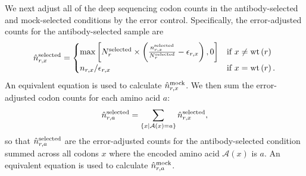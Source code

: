 \documentclass[11pt]{article}
\begin{document}
We next adjust all of the deep sequencing codon counts in the antibody-selected and mock-selected conditions by the error control. 
Specifically, the error-adjusted counts for the antibody-selected sample are
\begin{equation}
\label{eq:erroradjust}
\hat{n}_{r,x} ^{\rm{selected}}= \begin{cases}
\max\left[N_r^{\rm{selected}} \times \left(\frac{n_{r,x}^{\rm{selected}}}{N_r^{\rm{selected}}} - \epsilon_{r,x}\right), 0\right] & \mbox{if } x \ne \operatorname{wt}\left(r\right) \\
n_{r,x} / \epsilon_{r,x} & \mbox{if } x = \operatorname{wt}\left(r\right).
\end{cases}
\end{equation}
An equivalent equation is used to calculate $\hat{n}_{r,x} ^{\rm{mock}}$.
We then sum the error-adjusted codon counts for each amino acid $a$:
\begin{equation}
\hat{n}_{r,a}^{\rm{selected}} = \sum\limits_{\left\{x \mid \mathcal{A}\left(x\right) = a\right\}} \hat{n}_{r,x}^{\rm{selected}},
\end{equation}
so that $\hat{n}_{r,a}^{\rm{selected}}$ are the error-adjusted counts for the antibody-selected condition summed across all codons $x$ where the encoded amino acid $\mathcal{A}\left(x\right)$ is $a$.
An equivalent equation is used to calculate $\hat{n}_{r,a} ^{\rm{mock}}$.
\end{document}

